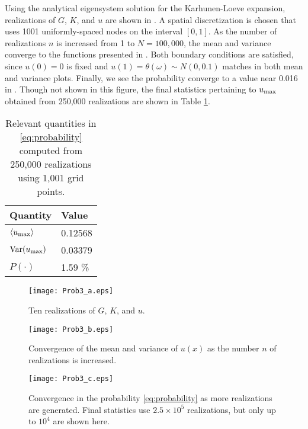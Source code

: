 \documentclass[11pt]{article}
\begin{document}
Using the analytical eigensystem solution for the Karhunen-Loeve expansion, realizations of $G$, $K$, and $u$ are shown in . A spatial discretization is chosen that uses 1001 uniformly-spaced nodes on the interval $[0,1]$. As the number of realizations $n$ is increased from 1 to $N=100,\!000$, the mean and variance converge to the functions presented in . Both boundary conditions are satisfied, since $u(0)=0$ is fixed and  $u(1) = \theta(\omega) \sim N(0,0.1)$ matches in both mean and variance plots. Finally, we see the probability converge to a value near 0.016 in . Though not shown in this figure, the final statistics pertaining to $u_{\text{max}}$ obtained from 250,000 realizations are shown in Table \ref{tbl:probabilities}.

\begin{table}[h]
\centering
\begin{tabular}{ll}
\toprule
Quantity & Value \\
\midrule
$\left\langle u_{\text{max}} \right\rangle$ & 0.12568 \\
$\operatorname{Var}(u_{\text{max}})$ & 0.03379 \\
$P(\cdot)$ & 1.59 \% \\
\bottomrule
\end{tabular}
\vspace{1em}
\caption{Relevant quantities in \eqref{eq:probability} computed from 250,000 realizations using 1,001 grid points.}
\label{tbl:probabilities}
\end{table}

\begin{figure}[t]
\centering
\texttt{[image: Prob3\_a.eps]}
\caption{Ten realizations of $G$, $K$, and $u$.}
\label{fig:prob3a}
\end{figure}

\begin{figure}[b]
\centering
\texttt{[image: Prob3\_b.eps]}
\caption{Convergence of the mean and variance of $u(x)$ as the number $n$ of realizations is increased.}
\label{fig:prob3b}
\end{figure}

\begin{figure}[t]
\centering
\texttt{[image: Prob3\_c.eps]}
\vspace{1em}
\caption{Convergence in the probability \eqref{eq:probability} as more realizations are generated. Final statistics use $2.5\times 10^5$ realizations, but only up to $10^4$ are shown here.}
\label{fig:prob3c}
\end{figure}

\end{document}
